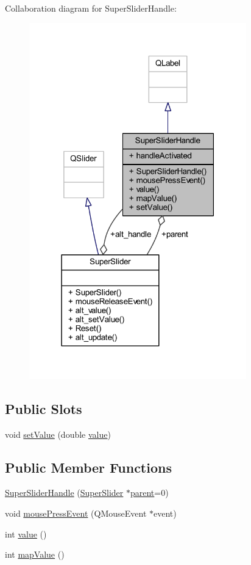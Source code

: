 Collaboration diagram for Super\+Slider\+Handle\+:
\nopagebreak
\begin{figure}[H]
\begin{center}
\leavevmode
\includegraphics[width=267pt]{class_super_slider_handle__coll__graph}
\end{center}
\end{figure}
\subsection*{Public Slots}
\begin{DoxyCompactItemize}
\item 
void \hyperlink{class_super_slider_handle_ac207cf8a1eb0a5412de13021cd8befda}{set\+Value} (double \hyperlink{class_super_slider_handle_a45284935c0a9a93f2e611161d3b78c61}{value})
\end{DoxyCompactItemize}
\subsection*{Public Member Functions}
\begin{DoxyCompactItemize}
\item 
\hyperlink{class_super_slider_handle_ae4c35dc37f3ec823934fe0150015c0e2}{Super\+Slider\+Handle} (\hyperlink{class_super_slider}{Super\+Slider} $\ast$\hyperlink{class_super_slider_handle_ae7159611443ea36306dab546ea939212}{parent}=0)
\item 
void \hyperlink{class_super_slider_handle_a4e6bf0699c88598690bbfcd10c2de0a0}{mouse\+Press\+Event} (Q\+Mouse\+Event $\ast$event)
\item 
int \hyperlink{class_super_slider_handle_a45284935c0a9a93f2e611161d3b78c61}{value} ()
\item 
int \hyperlink{class_super_slider_handle_a9d22009e1ffe51eb8e3d8595843618b6}{map\+Value} ()
\end{DoxyCompactItemize}
